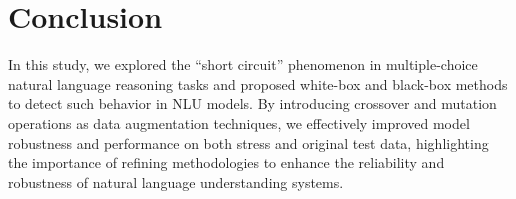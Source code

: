 \section{Conclusion}

In this study, we explored the ``short circuit'' phenomenon in multiple-choice natural language reasoning tasks and proposed white-box and black-box methods to detect such behavior in NLU models. By introducing crossover and mutation operations as data augmentation techniques, we effectively improved model robustness and performance on both stress and original test data, highlighting the importance of refining methodologies to enhance the reliability and robustness of natural language understanding systems.
